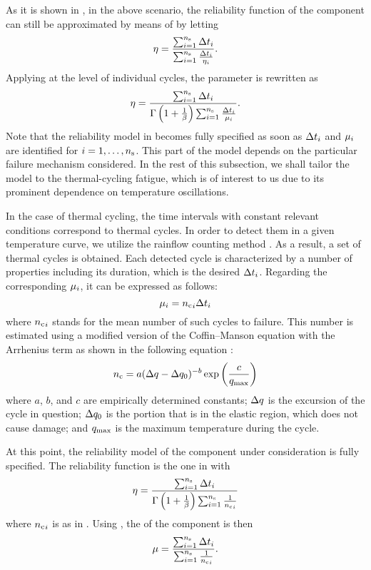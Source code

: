 As it is shown in \cite{xiang2010}, in the above scenario, the reliability
function of the component can still be approximated by means of
 by letting
\[
  \eta = \frac{\sum_{i = 1}^{n_\mathrm{s}} \Delta t_i}{\sum_{i = 1}^{n_\mathrm{s}} \frac{\Delta t_i}{\eta_i}}.
\]
Applying  at the level of individual cycles, the
parameter is rewritten as
\[
  \eta = \frac{\sum_{i = 1}^{n_\mathrm{s}} \Delta t_i}{\Gamma\left(1 + \frac{1}{\beta}\right) \sum_{i = 1}^{n_\mathrm{s}} \frac{\Delta t_i}{\mu_i}}.
\]
Note that the reliability model in  becomes fully
specified as soon as $\Delta t_i$ and $\mu_i$ are identified for $i =
1, \dots, {n_\mathrm{s}}$. This part of the model depends on the particular failure
mechanism considered. In the rest of this subsection, we shall tailor the model
to the thermal-cycling fatigue, which is of interest to us due to its prominent
dependence on temperature oscillations.

In the case of thermal cycling, the time intervals with constant relevant
conditions correspond to thermal cycles. In order to detect them in a given
temperature curve, we utilize the rainflow counting method \cite{xiang2010}. As
a result, a set of \ns thermal cycles is obtained. Each detected cycle is
characterized by a number of properties including its duration, which is the
desired $\Delta t_i$. Regarding the corresponding $\mu_i$, it can be expressed as
follows:
\[
  \mu_i = {n_\mathrm{c}}_i \Delta t_i
\]
where ${n_\mathrm{c}}_i$ stands for the mean number of such cycles to failure. This number
is estimated using a modified version of the Coffin--Manson equation with the
Arrhenius term as shown in the following equation \cite{xiang2010, jedec2010}:
\begin{equation} \elab{reliability-mean-cycles}
  \nc = a (\Delta \q - \Delta \q_0)^{-b} \exp\left(\frac{c}{\q_\maximum}\right)
\end{equation}
where $a$, $b$, and $c$ are empirically determined constants; $\Delta q$ is the
excursion of the cycle in question; $\Delta q_0$ is the portion that is in the
elastic region, which does not cause damage; and $q_{\mathrm{max}}$ is the maximum
temperature during the cycle.

At this point, the reliability model of the component under consideration is
fully specified. The reliability function is the one in
 with
\begin{equation} \elab{reliability-scale}
  \scale = \frac{\sum_{i = 1}^\ns \dt_i}{\Gamma\left(1 + \frac{1}{\shape}\right) \sum_{i = 1}^\ns \frac{1}{\nc_i}}
\end{equation}
where ${n_\mathrm{c}}_i$ is as in . Using
, the  of the
component is then
\begin{equation} \elab{reliability-mean-time}
  \mean = \frac{\sum_{i = 1}^\ns \dt_i}{\sum_{i = 1}^\ns \frac{1}{\nc_i}}.
\end{equation}

